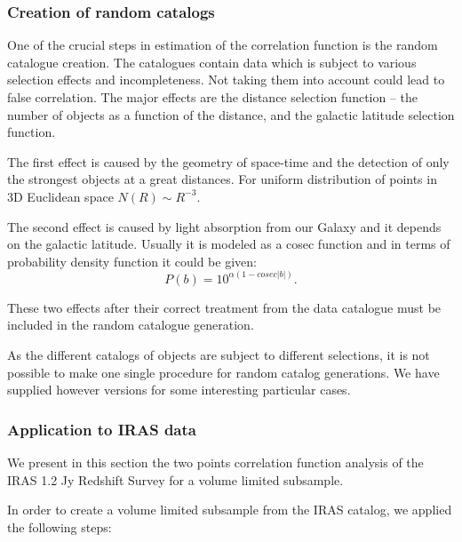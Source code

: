 \subsubsection{Creation of random catalogs}
One of the crucial steps in estimation of the correlation function is
the random catalogue creation. The catalogues contain data which is
subject to various selection effects and incompleteness. Not taking
them into account could lead to false correlation. The major effects
are the distance selection function -- the number of objects as a
function of the distance, and the galactic latitude
selection function. 

The first effect is caused by the geometry of space-time and the
detection of only the strongest objects at a great distances. For
uniform distribution of points in 3D Euclidean space $N(R) \sim
R^{-3}$.  

The second effect is caused by light absorption from our Galaxy and it 
depends on the galactic latitude. Usually it is modeled as a cosec 
function and in terms of probability density function it could be
given:
\begin{equation}
P(b) = 10^{\alpha(1-cosec|b|)}.
\end{equation}

These two effects after their correct treatment from the data
catalogue must be included in the random catalogue generation.

As the different catalogs of objects are subject to different
selections, it is not possible to make one single procedure for random
catalog generations. We have supplied however versions for some
interesting particular cases.




\subsubsection{Application to IRAS data}

We present in this section the two points correlation function
analysis of the IRAS 1.2 Jy Redshift Survey \cite{cf:fisher95} for a
volume limited subsample.

In order to create a volume limited subsample from the IRAS catalog,
we applied the following steps:

